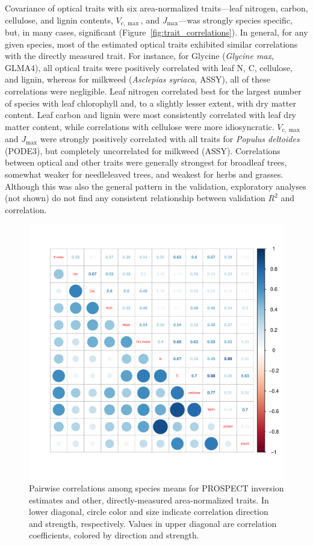 Covariance of optical traits with six area-normalized traits---leaf nitrogen, carbon, cellulose, and lignin contents, $V_{c,\max}$, and $J_{\max}$---was strongly species specific, but, in many cases, significant (Figure~\ref{fig:trait_correlations}).
In general, for any given species, most of the estimated optical traits exhibited similar correlations with the directly measured trait.
For instance, for Glycine (\textit{Glycine max}, GLMA4), all optical traits were positively correlated with leaf N, C, cellulose, and lignin, whereas for milkweed (\textit{Asclepias syriaca}, ASSY), all of these correlations were negligible.
Leaf nitrogen correlated best for the largest number of species with leaf chlorophyll and, to a slightly lesser extent, with dry matter content.
Leaf carbon and lignin were most consistently correlated with leaf dry matter content, while correlations with cellulose were more idiosyncratic.
$V_{c,\max}$ and $J_{\max}$ were strongly positively correlated with all traits for \textit{Populus deltoides} (PODE3), but completely uncorrelated for milkweed (ASSY).
Correlations between optical and other traits were generally strongest for broadleaf trees, somewhat weaker for needleleaved trees, and weakest for herbs and grasses.
Although this was also the general pattern in the validation, exploratory analyses (not shown) do not find any consistent relationship between validation $R^2$ and correlation.

\begin{figure}
  \centering
  \includegraphics[width=\textwidth]{3_prospect/figures/trait_correlations_species.pdf}
  \caption{%
    Pairwise correlations among species means for PROSPECT inversion estimates and other, directly-measured area-normalized traits.
    In lower diagonal, circle color and size indicate correlation direction and strength, respectively.
    Values in upper diagonal are correlation coefficients, colored by direction and strength.
  }\label{fig:trait_correlations_species}
\end{figure}

